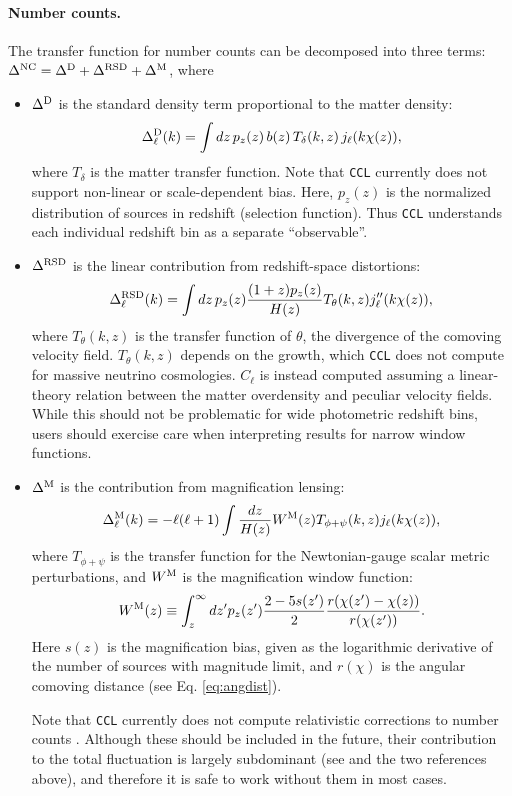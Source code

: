 \documentclass[\docopts]{\docclass}
\newcommand{\ccl}{{\tt CCL}\xspace}
\begin{document}
\paragraph{\bf Number counts.} The transfer function for number counts can be decomposed into three terms: $\Delta^{\rm NC}=\Delta^{\rm D}+\Delta^{\rm RSD}+\Delta^{\rm M}$, where
\begin{itemize}
  \item $\Delta^{\rm D}$ is the standard density term proportional to the matter density:
        \begin{equation}
          \Delta^{\rm D}_\ell(k)=\int dz\,p_z(z)\,b(z)\,T_\delta(k,z)\,j_\ell(k\chi(z)),
        \end{equation}
        where $T_\delta$ is the matter transfer function. Note that \ccl currently does not support non-linear or scale-dependent bias. Here, $p_z(z)$ is the normalized distribution of sources in redshift (selection function). Thus \ccl understands each individual redshift bin as a separate ``observable''.
  \item $\Delta^{\rm RSD}$ is the linear contribution from redshift-space distortions:
        \begin{equation}
          \Delta^{\rm RSD}_\ell(k)=\int dz\,p_z(z)\frac{(1+z) p_z(z)}{H(z)}T_\theta(k,z) j_\ell''(k\chi(z)),
        \end{equation}
        where $T_\theta(k,z)$ is the transfer function of $\theta$, the divergence of the comoving velocity field. $T_\theta(k,z)$ depends on the growth, which \ccl does not compute for massive neutrino cosmologies. $C_\ell$ is instead computed assuming a linear-theory relation between the matter overdensity and peculiar velocity fields. While this should not be problematic for wide photometric redshift bins, users should exercise care when interpreting results for narrow window functions.
  \item $\Delta^{\rm M}$ is the contribution from magnification lensing:
        \begin{equation}
          \Delta_\ell^{\rm M}(k)=-\ell(\ell+1)\int \frac{dz}{H(z)} W^{\rm M}(z) T_{\phi+\psi}(k,z) j_\ell(k\chi(z)),
        \end{equation}
        where $T_{\phi+\psi}$ is the transfer function for the Newtonian-gauge scalar metric perturbations, and $W^{\rm M}$ is the magnification window function:
        \begin{equation}
           W^{\rm M}(z)\equiv\int_z^\infty dz' p_z(z')\frac{2-5s(z')}{2}\frac{r(\chi(z')-\chi(z))}{r(\chi(z'))}.
        \end{equation}
        Here $s(z)$ is the magnification bias, given as the logarithmic derivative of the number of sources with magnitude limit, and $r(\chi)$ is the angular comoving distance (see Eq. \ref{eq:angdist}).

        Note that \ccl currently does not compute relativistic corrections to number counts \cite{2011PhRvD..84d3516C,2011PhRvD..84f3505B}. Although these should be included in the future, their contribution to the total fluctuation is largely subdominant (see \cite{GReffects} and the two references above), and therefore it is safe to work without them in most cases.
\end{itemize}
\end{document}
